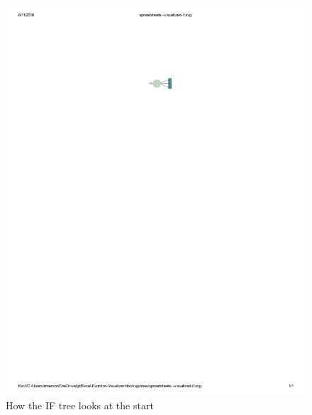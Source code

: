 \documentclass[conference]{IEEEtran}
\begin{document}
	\begin{figure}[h] \centering \includegraphics[scale=.4]{start} \caption{How the
			IF tree looks at the start} \label{fig:startpic} \end{figure}
	
\end{document}
